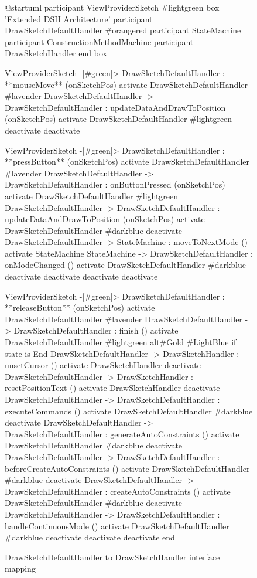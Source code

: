 \documentclass[12pt,twoside,a4paper]{book}
\begin{document}
    \begin{figure}
    \centering
    \caption{DrawSketchDefaultHandler to DrawSketchHandler interface mapping}
        \begin{plantuml}
        @startuml
        participant ViewProviderSketch #lightgreen
        box 'Extended DSH Architecture'
        participant DrawSketchDefaultHandler #orangered
        participant StateMachine
        participant ConstructionMethodMachine
        participant DrawSketchHandler
        end box

        ViewProviderSketch -[#green]> DrawSketchDefaultHandler : **mouseMove** (onSketchPos)
        activate DrawSketchDefaultHandler #lavender
        DrawSketchDefaultHandler -> DrawSketchDefaultHandler : updateDataAndDrawToPosition (onSketchPos)
        activate DrawSketchDefaultHandler #lightgreen
        deactivate
        deactivate

        ViewProviderSketch -[#green]> DrawSketchDefaultHandler : **pressButton** (onSketchPos)
        activate DrawSketchDefaultHandler #lavender
        DrawSketchDefaultHandler -> DrawSketchDefaultHandler : onButtonPressed (onSketchPos)
        activate DrawSketchDefaultHandler #lightgreen
        DrawSketchDefaultHandler -> DrawSketchDefaultHandler : updateDataAndDrawToPosition (onSketchPos)
        activate DrawSketchDefaultHandler #darkblue
        deactivate
        DrawSketchDefaultHandler -> StateMachine : moveToNextMode ()
        activate StateMachine
        StateMachine -> DrawSketchDefaultHandler : onModeChanged ()
        activate DrawSketchDefaultHandler #darkblue
        deactivate
        deactivate
        deactivate
        deactivate

        ViewProviderSketch -[#green]> DrawSketchDefaultHandler : **releaseButton** (onSketchPos)
        activate DrawSketchDefaultHandler #lavender
        DrawSketchDefaultHandler -> DrawSketchDefaultHandler : finish ()
        activate DrawSketchDefaultHandler #lightgreen
        alt#Gold #LightBlue if state is End
        DrawSketchDefaultHandler -> DrawSketchHandler : unsetCursor ()
        activate DrawSketchHandler
        deactivate
        DrawSketchDefaultHandler -> DrawSketchHandler : resetPositionText ()
        activate DrawSketchHandler
        deactivate
        DrawSketchDefaultHandler -> DrawSketchDefaultHandler : executeCommands ()
        activate DrawSketchDefaultHandler #darkblue
        deactivate
        DrawSketchDefaultHandler -> DrawSketchDefaultHandler : generateAutoConstraints ()
        activate DrawSketchDefaultHandler #darkblue
        deactivate
        DrawSketchDefaultHandler -> DrawSketchDefaultHandler : beforeCreateAutoConstraints ()
        activate DrawSketchDefaultHandler #darkblue
        deactivate
        DrawSketchDefaultHandler -> DrawSketchDefaultHandler : createAutoConstraints ()
        activate DrawSketchDefaultHandler #darkblue
        deactivate
        DrawSketchDefaultHandler -> DrawSketchDefaultHandler : handleContinuousMode ()
        activate DrawSketchDefaultHandler #darkblue
        deactivate
        deactivate
        deactivate
        end


\end{plantuml}
\end{figure}
\end{document}
